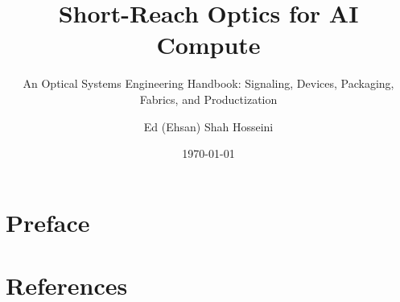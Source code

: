 


\title{Short-Reach Optics for AI Compute}
\subtitle{An Optical Systems Engineering Handbook: Signaling, Devices, Packaging, Fabrics, and Productization}
\author{Ed (Ehsan) Shah Hosseini}
\date{\today}


\makeatletter
\let\cite\citep
\let\@tufte@normal@cite\citep
\makeatother

\maketitle


\frontmatter

\chapter*{Preface}


\tableofcontents
\clearpage

\mainmatter














\appendix














\backmatter

\chapter*{References}



